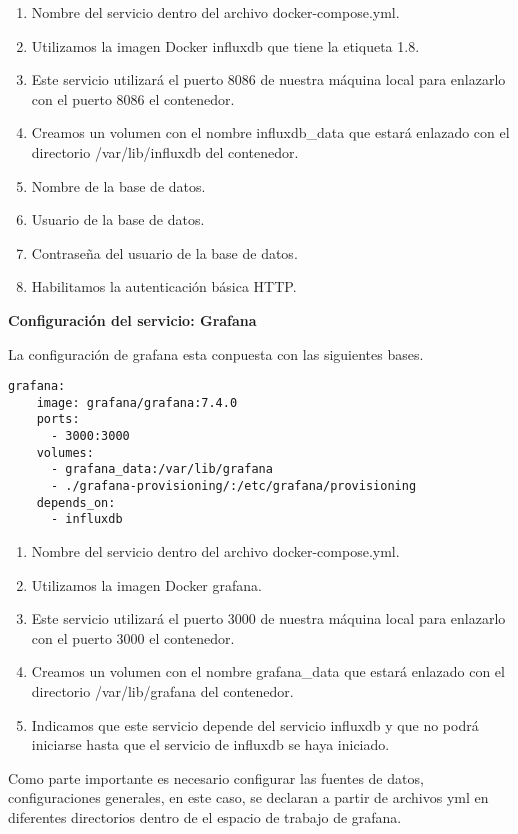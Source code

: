 \begin{enumerate}
  \item Nombre del servicio dentro del archivo docker-compose.yml.
  \item Utilizamos la imagen Docker influxdb que tiene la etiqueta 1.8.
  \item Este servicio utilizará el puerto 8086 de nuestra máquina local para
    enlazarlo con el puerto 8086 el contenedor.
  \item Creamos un volumen con el nombre influxdb\_data que estará enlazado con
    el directorio /var/lib/influxdb del contenedor.
  \item Nombre de la base de datos.
  \item Usuario de la base de datos.
  \item Contraseña del usuario de la base de datos.
  \item Habilitamos la autenticación básica HTTP.
\end{enumerate}

\begin{flushleft}
  \textbf{Configuración del servicio: Grafana}
\end{flushleft}
La configuración de grafana esta conpuesta con las siguientes bases.

\begin{verbatim}
grafana: 
    image: grafana/grafana:7.4.0 
    ports:
      - 3000:3000 
    volumes:
      - grafana_data:/var/lib/grafana 
      - ./grafana-provisioning/:/etc/grafana/provisioning 
    depends_on: 
      - influxdb
\end{verbatim}

\begin{enumerate}
\item Nombre del servicio dentro del archivo docker-compose.yml.
\item Utilizamos la imagen Docker grafana.
\item Este servicio utilizará el puerto 3000 de nuestra máquina local para
  enlazarlo con el puerto 3000 el contenedor.
\item Creamos un volumen con el nombre grafana\_data que estará enlazado con el
  directorio /var/lib/grafana del contenedor.
\item Indicamos que este servicio depende del servicio influxdb y que no podrá
  iniciarse hasta que el servicio de influxdb se haya iniciado.
\end{enumerate}


Como parte importante es necesario configurar las fuentes de datos,
configuraciones generales, en este caso, se declaran a partir de archivos yml
en diferentes directorios dentro de el espacio de trabajo de grafana. 


